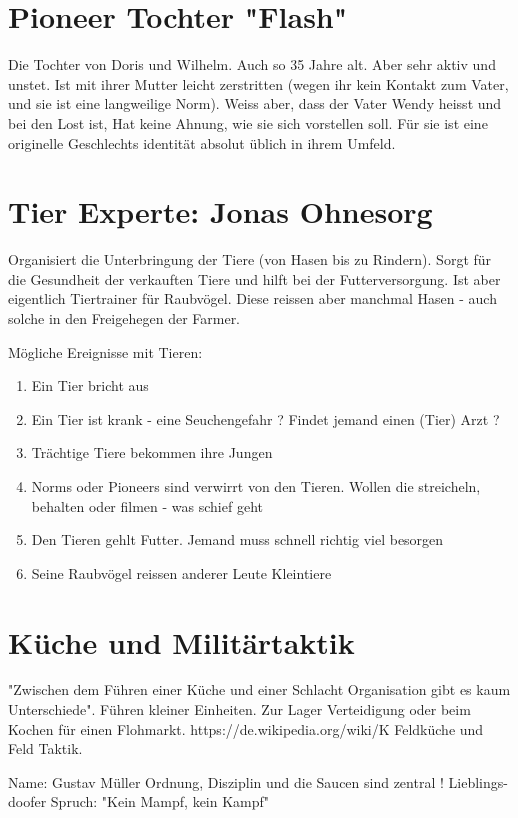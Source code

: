 \documentclass{book}
\begin{document}
\section{Pioneer Tochter "Flash"}
Die Tochter von Doris und Wilhelm. Auch so 35 Jahre alt. Aber sehr aktiv und unstet. Ist mit ihrer Mutter leicht zerstritten (wegen ihr kein Kontakt zum Vater, und sie ist eine langweilige Norm). Weiss aber, dass der Vater Wendy heisst und bei den Lost ist, Hat keine Ahnung, wie sie sich vorstellen soll. Für sie ist eine originelle Geschlechts identität absolut üblich in ihrem Umfeld.

\section{Tier Experte: Jonas Ohnesorg}

Organisiert die Unterbringung der Tiere (von Hasen bis zu Rindern). Sorgt für die Gesundheit der verkauften Tiere und hilft bei der Futterversorgung. Ist aber eigentlich Tiertrainer für Raubvögel. Diese reissen aber manchmal Hasen - auch solche in den Freigehegen der Farmer.

Mögliche Ereignisse mit Tieren:

\begin{enumerate}
\item Ein Tier bricht aus
\item Ein Tier ist krank - eine Seuchengefahr ? Findet jemand einen (Tier) Arzt ?
\item Trächtige Tiere bekommen ihre Jungen
\item Norms oder Pioneers sind verwirrt von den Tieren. Wollen die streicheln, behalten oder filmen - was schief geht
\item Den Tieren gehlt Futter. Jemand muss schnell richtig viel besorgen
\item Seine Raubvögel reissen anderer Leute Kleintiere
\end{enumerate}


\section{Küche und Militärtaktik}
"Zwischen dem Führen einer Küche und einer Schlacht Organisation gibt es kaum Unterschiede". Führen kleiner Einheiten. Zur Lager Verteidigung oder beim Kochen für einen Flohmarkt. https://de.wikipedia.org/wiki/K%
Feldküche und Feld Taktik.

Name: Gustav Müller
Ordnung, Disziplin und die Saucen sind zentral !
Lieblings-doofer Spruch: "Kein Mampf, kein Kampf"
\end{document}
